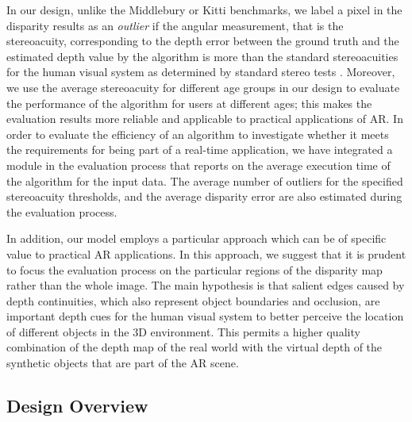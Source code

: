 
In our design, unlike the Middlebury or Kitti benchmarks, we label a pixel in the disparity results as an \textit{outlier} if the angular
measurement, that is the stereoacuity, corresponding to the depth error between the ground truth and the estimated depth value by the 
algorithm is more than the standard stereoacuities
for the human visual system as determined
by standard stereo tests \cite{binr83,garn06}. 
Moreover, we use the average stereoacuity for different age groups \cite{garn06} in our design to evaluate the performance of the algorithm for users 
at different ages; this makes the evaluation results more reliable and applicable to practical applications of AR.
In order to evaluate the efficiency of an algorithm to investigate whether it meets the requirements for being part of a real-time application, 
we have integrated a module in the evaluation process that reports on the average execution time of the algorithm for the input data.
The average number of outliers for the specified stereoacuity thresholds, and the average disparity error are also estimated during the evaluation process.

In addition, our model employs a particular approach which can be of specific value to practical AR applications. In this approach, we suggest that
it is prudent to focus the evaluation process on the particular regions of the disparity map rather than the whole image. The main hypothesis
is that salient edges caused by depth continuities, which also represent object boundaries and occlusion, are important depth cues for the human
visual system to better perceive the location of different objects in the 3D environment.
This permits a higher quality combination of the depth map of the real world with the virtual depth of the synthetic objects that are part of the AR scene.

\subsection{Design Overview}

